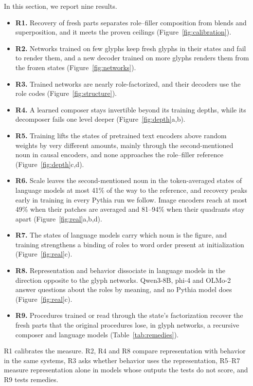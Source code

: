 \documentclass[10pt]{article}
\theoremstyle{plain}
\theoremstyle{remark}
\begin{document}
In this section, we report nine results.
\begin{itemize}
  \item \textbf{R1.} Recovery of fresh parts separates role--filler composition from blends and superposition, and it meets the proven ceilings (Figure~\ref{fig:calibration}).
  \item \textbf{R2.} Networks trained on few glyphs keep fresh glyphs in their states and fail to render them, and a new decoder trained on more glyphs renders them from the frozen states (Figure~\ref{fig:networks}).
  \item \textbf{R3.} Trained networks are nearly role-factorized, and their decoders use the role codes (Figure~\ref{fig:structure}).
  \item \textbf{R4.} A learned composer stays invertible beyond its training depths, while its decomposer fails one level deeper (Figure~\ref{fig:depth}a,b).
  \item \textbf{R5.} Training lifts the states of pretrained text encoders above random weights by very different amounts, mainly through the second-mentioned noun in causal encoders, and none approaches the role--filler reference (Figure~\ref{fig:depth}c,d).
  \item \textbf{R6.} Scale leaves the second-mentioned noun in the token-averaged states of language models at most 41\% of the way to the reference, and recovery peaks early in training in every Pythia run we follow. Image encoders reach at most 49\% when their patches are averaged and 81--94\% when their quadrants stay apart (Figure~\ref{fig:real}a,b,d).
  \item \textbf{R7.} The states of language models carry which noun is the figure, and training strengthens a binding of roles to word order present at initialization (Figure~\ref{fig:real}c).
  \item \textbf{R8.} Representation and behavior dissociate in language models in the direction opposite to the glyph networks. Qwen3-8B, phi-4 and OLMo-2 answer questions about the roles by meaning, and no Pythia model does (Figure~\ref{fig:real}c).
  \item \textbf{R9.} Procedures trained or read through the state's factorization recover the fresh parts that the original procedures lose, in glyph networks, a recursive composer and language models (Table~\ref{tab:remedies}).
\end{itemize}
R1 calibrates the measure. R2, R4 and R8 compare representation with behavior in the same systems, R3 asks whether behavior uses the representation, R5--R7 measure representation alone in models whose outputs the tests do not score, and R9 tests remedies.
\end{document}
